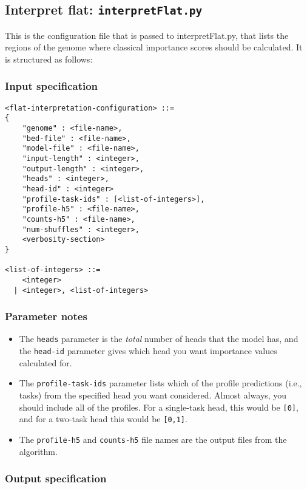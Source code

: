 \documentclass{article}
\begin{document}
\newpage

\subsection{Interpret flat: \texttt{interpretFlat.py}}

This is the configuration file that is passed to interpretFlat.py, that lists the regions of the genome where classical importance scores should be calculated. It is structured as follows:

\subsubsection{Input specification}

\begin{lstlisting}
<flat-interpretation-configuration> ::=
{
    "genome" : <file-name>,
    "bed-file" : <file-name>,
    "model-file" : <file-name>,
    "input-length" : <integer>,
    "output-length" : <integer>,
    "heads" : <integer>,
    "head-id" : <integer>
    "profile-task-ids" : [<list-of-integers>],
    "profile-h5" : <file-name>,
    "counts-h5" : <file-name>,
    "num-shuffles" : <integer>,
    <verbosity-section>
}

<list-of-integers> ::=
    <integer>
  | <integer>, <list-of-integers>

\end{lstlisting}

\subsubsection{Parameter notes}
\begin{itemize}
    \item The \texttt{heads} parameter is the \emph{total} number of heads that the model has, and the \texttt{head-id} parameter gives which head you want importance values calculated for.
    \item The \texttt{profile-task-ids} parameter lists which of the profile predictions (i.e., tasks) from the specified head you want considered. Almost always, you should include all of the profiles. For a single-task head, this would be \texttt{[0]}, and for a two-task head this would be \texttt{[0,1]}.
    \item The \texttt{profile-h5} and \texttt{counts-h5} file names are the output files from the algorithm.
\end{itemize}

\subsubsection{Output specification}
\end{document}
